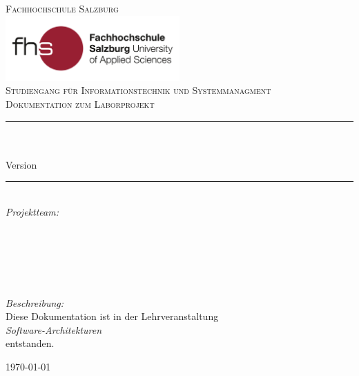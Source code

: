 \begin{titlepage}

\begin{center}



\textsc{\LARGE Fachhochschule Salzburg}\\[1.5cm]
\includegraphics[width=0.5\textwidth]{title/FH-Salzburg_RGB.jpg}\\[1cm]

\textsc{\LARGE Studiengang für Informationstechnik und Systemmanagment}\\[1.5cm]

\textsc{\Large Dokumentation zum Laborprojekt}\\[0.5cm]


\newcommand{\HRule}{\rule{\linewidth}{0.5mm}}
\HRule \\[0.5cm]
{ \huge \bfseries \projectName}\\[0.4cm]
Version \vhCurrentVersion

\HRule \\[1.5cm]


 \large
\emph{Projektteam:}\\ 

\LA \\
\AR \\
\PR \\
\FS \\
\MT \\


\hfill

\emph{Beschreibung:}\\
Diese Dokumentation ist in der Lehrveranstaltung\\ \textit{Software-Architekturen}\\ entstanden.

\vfill

{\large \today}

\end{center}

\end{titlepage}
